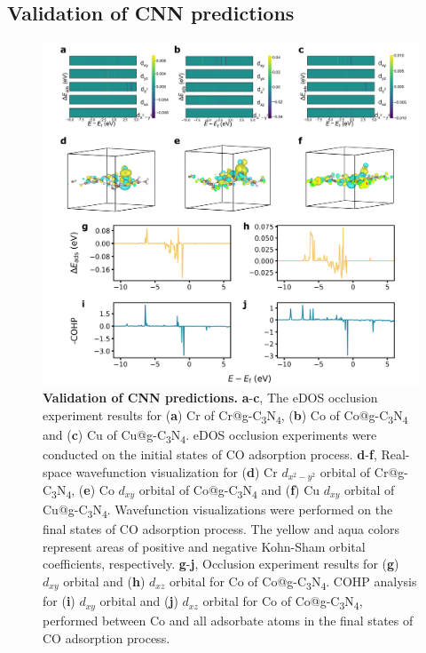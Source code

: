 
\subsection{Validation of CNN predictions}

\begin{figure}[htbp]
    \centering
    \includegraphics[width=\textwidth]{main_fig4_validation.png}
    \caption{\textbf{Validation of CNN predictions.}
    \textbf{a}-\textbf{c}, The eDOS occlusion experiment results for
    (\textbf{a}) Cr of Cr@g-C\textsubscript{3}N\textsubscript{4},
    (\textbf{b}) Co of Co@g-C\textsubscript{3}N\textsubscript{4} and
    (\textbf{c}) Cu of Cu@g-C\textsubscript{3}N\textsubscript{4}.
    eDOS occlusion experiments were conducted on the initial states of CO adsorption process.
    \textbf{d}-\textbf{f}, Real-space wavefunction visualization for
    (\textbf{d}) Cr $d_{x^2-y^2}$ orbital of Cr@g-C\textsubscript{3}N\textsubscript{4},
    (\textbf{e}) Co $d_{xy}$ orbital of Co@g-C\textsubscript{3}N\textsubscript{4} and
    (\textbf{f}) Cu $d_{xy}$ orbital of Cu@g-C\textsubscript{3}N\textsubscript{4}.
    Wavefunction visualizations were performed on the final states of CO adsorption process.
    The yellow and aqua colors represent areas of positive and negative
    Kohn-Sham orbital coefficients, respectively.
    \textbf{g}-\textbf{j}, Occlusion experiment results for (\textbf{g}) $d_{xy}$ orbital
    and (\textbf{h}) $d_{xz}$ orbital for Co of Co@g-C\textsubscript{3}N\textsubscript{4}.
    COHP analysis for (\textbf{i}) $d_{xy}$ orbital and (\textbf{j}) $d_{xz}$ orbital for
    Co of Co@g-C\textsubscript{3}N\textsubscript{4}, performed between Co and
    all adsorbate atoms in the final states of CO adsorption process.}
    \label{main_fig4:validation}
\end{figure}

